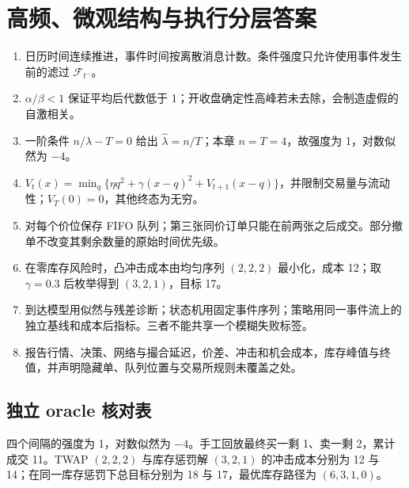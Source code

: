 \chapter{高频、微观结构与执行分层答案}
\begin{enumerate}[leftmargin=*]
  \item 日历时间连续推进，事件时间按离散消息计数。条件强度只允许使用事件发生前的滤过 $\mathcal F_{t^-}$。
  \item $\alpha/\beta<1$ 保证平均后代数低于 1；开收盘确定性高峰若未去除，会制造虚假的自激相关。
  \item 一阶条件 $n/\lambda-T=0$ 给出 $\widehat\lambda=n/T$；本章 $n=T=4$，故强度为 1，对数似然为 $-4$。
  \item $V_t(x)=\min_q\{\eta q^2+\gamma(x-q)^2+V_{t+1}(x-q)\}$，并限制交易量与流动性；$V_T(0)=0$，其他终态为无穷。
  \item 对每个价位保存 FIFO 队列；第三张同价订单只能在前两张之后成交。部分撤单不改变其剩余数量的原始时间优先级。
  \item 在零库存风险时，凸冲击成本由均匀序列 $(2,2,2)$ 最小化，成本 12；取 $\gamma=0.3$ 后枚举得到 $(3,2,1)$，目标 17。
  \item 到达模型用似然与残差诊断；状态机用固定事件序列；策略用同一事件流上的独立基线和成本后指标。三者不能共享一个模糊失败标签。
  \item 报告行情、决策、网络与撮合延迟，价差、冲击和机会成本，库存峰值与终值，并声明隐藏单、队列位置与交易所规则未覆盖之处。
\end{enumerate}

\section*{独立 oracle 核对表}
四个间隔的强度为 1，对数似然为 $-4$。手工回放最终买一剩 1、卖一剩 2，累计成交 11。TWAP $(2,2,2)$ 与库存惩罚解 $(3,2,1)$ 的冲击成本分别为 12 与 14；在同一库存惩罚下总目标分别为 18 与 17，最优库存路径为 $(6,3,1,0)$。
